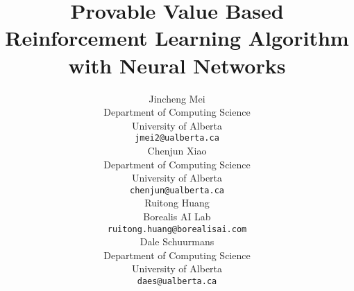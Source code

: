 \documentclass{article}
\title{Provable Value Based Reinforcement Learning Algorithm with Neural Networks
}
\author{
  Jincheng Mei \\
  Department of Computing Science\\
  University of Alberta\\
  \texttt{jmei2@ualberta.ca} \\
  \And
  Chenjun Xiao \\
  Department of Computing Science\\
  University of Alberta\\
  \texttt{chenjun@ualberta.ca} \\
  \AND
  Ruitong Huang \\
  Borealis AI Lab\\
  \texttt{ruitong.huang@borealisai.com} \\
  \And
  Dale Schuurmans \\
  Department of Computing Science\\
  University of Alberta\\
  \texttt{daes@ualberta.ca} \\
}
\begin{document}

\maketitle

\begin{abstract}

\end{abstract}















\appendix



{\small


}
\end{document}
